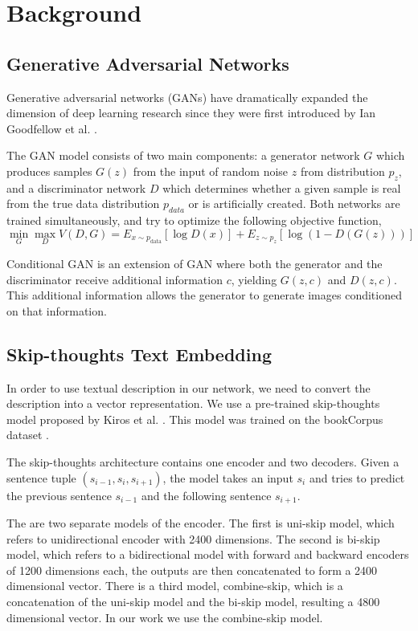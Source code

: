 \documentclass[a4paper]{article}
\begin{document}
\section{Background}
\subsection{Generative Adversarial Networks}
Generative adversarial networks (GANs) have dramatically expanded the dimension of deep learning research since they were first introduced by Ian Goodfellow et al. \cite{goodfellow2014generative}.

The GAN model consists of two main components: a generator network \(G\) which produces samples \(G(z)\) from the input of random noise \(z\) from distribution \(p_z\), and a discriminator network \(D\) which determines whether a given sample is real from the true data distribution \(p_{data}\) or is artificially created. Both networks are trained simultaneously, and try to optimize the following objective function,
\begin{equation}
    \min_{G}\max_{D}{V(D,G)} = E_{x \sim p_{\mathrm{data}}} [\log{D(x)}] + E_{z \sim p_z} [\log(1-D(G(z)))]
\end{equation}

Conditional GAN \cite{mirza2014conditional} is an extension of GAN where both the generator and the discriminator receive additional information \(c\), yielding \(G(z,c)\) and \(D(z,c)\). This additional information allows the generator to generate images conditioned on that information.

\subsection{Skip-thoughts Text Embedding}
In order to use textual description in our network, we need to convert the description into a vector representation. We use a pre-trained skip-thoughts model proposed by Kiros et al. \cite{kiros2015skip}. This model was trained on the bookCorpus dataset \cite{zhu2015aligning}. 

The skip-thoughts architecture contains one encoder and two decoders. Given a sentence tuple \((s_{i-1},s_i,s_{i+1})\), 
the model takes an input \(s_i\) and tries to predict the previous sentence \(s_{i-1}\) and the following sentence \(s_{i+1}\). 

The are two separate models of the encoder. The first is uni-skip model, which refers to unidirectional encoder with 2400 dimensions. The second is bi-skip model, which refers to a bidirectional model with forward and backward encoders of 1200 dimensions each, the outputs are then concatenated to form a 2400 dimensional vector. There is a third model, combine-skip, which is a concatenation of the uni-skip model and the bi-skip model, resulting a 4800 dimensional vector. In our work we use the combine-skip model.
\end{document}
